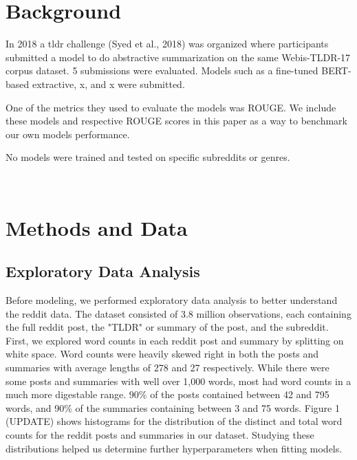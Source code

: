 \documentclass[11pt,a4paper, twocolumn]{article}
\begin{document}
\section{Background}
\label{sec:length}

In 2018 a tldr challenge (Syed et al., 2018) was organized where participants submitted a model to do abstractive summarization on the same Webis-TLDR-17 corpus dataset. 5 submissions were evaluated. Models such as a fine-tuned BERT-based extractive, x, and x were submitted.

One of the metrics they used to evaluate the models was ROUGE. We include these models and respective ROUGE scores in this paper as a way to benchmark our own models performance.

No models were trained and tested on specific subreddits or genres.


\\

\section{Methods and Data}

\subsection{Exploratory Data Analysis}

Before modeling, we performed exploratory data analysis to better understand the reddit data. 
The dataset consisted of 3.8 million observations, each containing the full reddit post, the "TLDR" or summary of the post, and the subreddit. 
First, we explored word counts in each reddit post and summary by splitting on white space. 
Word counts were heavily skewed right in both the posts and summaries with average lengths of 278 and 27 respectively. 
While there were some posts and summaries with well over 1,000 words, most had word counts in a much more digestable range. 
90\% of the posts contained between 42 and 795 words, and 90\% of the summaries containing between 3 and 75 words. 
Figure 1 (UPDATE) shows histograms for the distribution of the distinct and total word counts for the reddit posts and summaries in our dataset. 
Studying these distributions helped us determine further hyperparameters when fitting models. 
\end{document}

